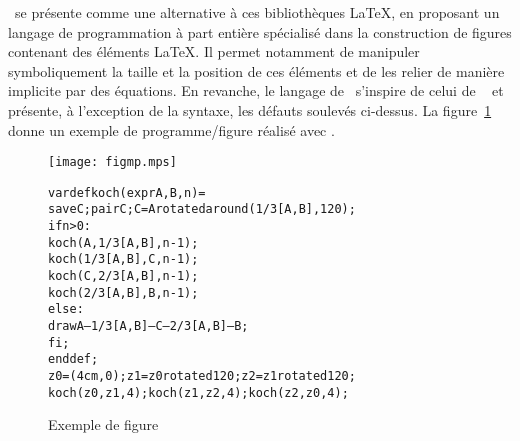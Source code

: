 \documentclass[twoside]{studia-Hermann}
\newcommand{\asymptote}{\textsf{Asymptote}}
\newcommand{\metapost}{\MP}
\newcommand{\metafont}{\MF}
\begin{document}
\metapost\ se présente comme une alternative à ces bibliothèques
\LaTeX, en proposant un langage de programmation à part entière
spécialisé dans la construction de figures contenant des éléments
\LaTeX. Il permet notamment de manipuler symboliquement la taille et
la position de ces éléments et de les relier de manière implicite par
des équations. En revanche, le langage de \metapost\ s'inspire de
celui de \metafont~\cite{metafont} et présente, à l'exception de la
syntaxe, les défauts soulevés ci-dessus. La figure~\ref{fig:metapost}
donne un exemple de programme/figure réalisé avec \metapost.
\begin{figure}[t]
\vspace*{1em}
\begin{minipage}{.3\linewidth}
  \texttt{[image: figmp.mps]}
\end{minipage}
\begin{minipage}{.7\linewidth}
\small
\begin{alltt}
  vardef koch(expr A,B,n) =
    save C; pair C; C = A rotatedaround(1/3[A,B], 120);
    if n>0:
      koch( A,        1/3[A,B], n-1);
      koch( 1/3[A,B], C,        n-1);
      koch( C,        2/3[A,B], n-1);
      koch( 2/3[A,B], B,        n-1);
    else:
      draw A--1/3[A,B]--C--2/3[A,B]--B;
    fi;
  enddef;
  z0=(4cm,0); z1=z0 rotated 120; z2=z1 rotated 120;
  koch( z0, z1, 4 ); koch( z1, z2, 4 ); koch( z2, z0, 4 );
\end{alltt}
\end{minipage}
\caption{Exemple de figure \metapost}\label{fig:metapost}
\end{figure}
\end{document}
